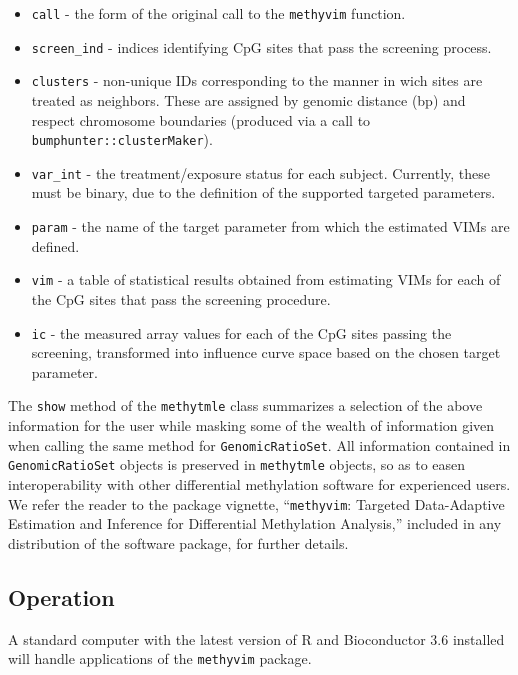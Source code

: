 \documentclass[9pt,a4paper,]{extarticle}
\theoremstyle{definition}
\theoremstyle{definition}
\theoremstyle{definition}
\theoremstyle{remark}
\begin{document}
\begin{itemize}
\item
  \texttt{call} - the form of the original call to the \texttt{methyvim} function.
\item
  \texttt{screen\_ind} - indices identifying CpG sites that pass the screening process.
\item
  \texttt{clusters} - non-unique IDs corresponding to the manner in wich sites are
  treated as neighbors. These are assigned by genomic distance (bp) and respect
  chromosome boundaries (produced via a call to \texttt{bumphunter::clusterMaker}).
\item
  \texttt{var\_int} - the treatment/exposure status for each subject. Currently, these
  must be binary, due to the definition of the supported targeted parameters.
\item
  \texttt{param} - the name of the target parameter from which the estimated VIMs are
  defined.
\item
  \texttt{vim} - a table of statistical results obtained from estimating VIMs for
  each of the CpG sites that pass the screening procedure.
\item
  \texttt{ic} - the measured array values for each of the CpG sites passing the
  screening, transformed into influence curve space based on the chosen target
  parameter.
\end{itemize}

The \texttt{show} method of the \texttt{methytmle} class summarizes a selection of the above
information for the user while masking some of the wealth of information given
when calling the same method for \texttt{GenomicRatioSet}. All information contained in
\texttt{GenomicRatioSet} objects is preserved in \texttt{methytmle} objects, so as to easen
interoperability with other differential methylation software for experienced
users. We refer the reader to the package vignette, ``\texttt{methyvim}: Targeted
Data-Adaptive Estimation and Inference for Differential Methylation Analysis,''
included in any distribution of the software package, for further details.

\hypertarget{operation}{%
\subsection{Operation}\label{operation}}

A standard computer with the latest version of R and Bioconductor 3.6 installed
will handle applications of the \texttt{methyvim} package.
\end{document}
